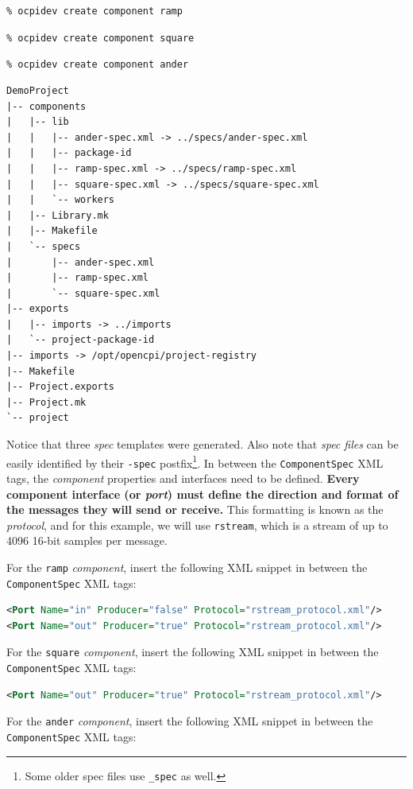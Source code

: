 \forceindent\verb+% ocpidev create component ramp+

\forceindent\verb+% ocpidev create component square+

\forceindent\verb+% ocpidev create component ander+\\
\OcpidevCreate{}

\bstart
\begin{verbatim}
DemoProject
|-- components
|   |-- lib
|   |   |-- ander-spec.xml -> ../specs/ander-spec.xml
|   |   |-- package-id
|   |   |-- ramp-spec.xml -> ../specs/ramp-spec.xml
|   |   |-- square-spec.xml -> ../specs/square-spec.xml
|   |   `-- workers
|   |-- Library.mk
|   |-- Makefile
|   `-- specs
|       |-- ander-spec.xml
|       |-- ramp-spec.xml
|       `-- square-spec.xml
|-- exports
|   |-- imports -> ../imports
|   `-- project-package-id
|-- imports -> /opt/opencpi/project-registry
|-- Makefile
|-- Project.exports
|-- Project.mk
`-- project
\end{verbatim}
\bend
Notice that three \textit{spec} templates were generated. Also note that \textit{spec files} can be easily identified by their \verb+-spec+ postfix\footnote{Some older spec files use \texttt{\_spec} as well.}. In between the \verb+ComponentSpec+ XML tags, the \textit{component} properties and interfaces need to be defined. \textbf{Every component interface (or \textit{port}) must define the direction and format of the messages they will send or receive.} This formatting is known as the \textit{protocol}, and for this example, we will use \texttt{rstream}, which is a stream of up to 4096 16-bit samples per message.

\bstart
For the \verb+ramp+ \textit{component}, insert the following XML snippet in between the \verb+ComponentSpec+ XML tags:

\begin{lstlisting}[language=xml]
<Port Name="in" Producer="false" Protocol="rstream_protocol.xml"/>
<Port Name="out" Producer="true" Protocol="rstream_protocol.xml"/>
\end{lstlisting}
\bend
\bstart
For the \verb+square+ \textit{component}, insert the following XML snippet in between the \verb+ComponentSpec+ XML tags:

\begin{lstlisting}[language=xml]
<Port Name="out" Producer="true" Protocol="rstream_protocol.xml"/>
\end{lstlisting}
\bend
\bstart
For the \verb+ander+ \textit{component}, insert the following XML snippet in between the \verb+ComponentSpec+ XML tags:


